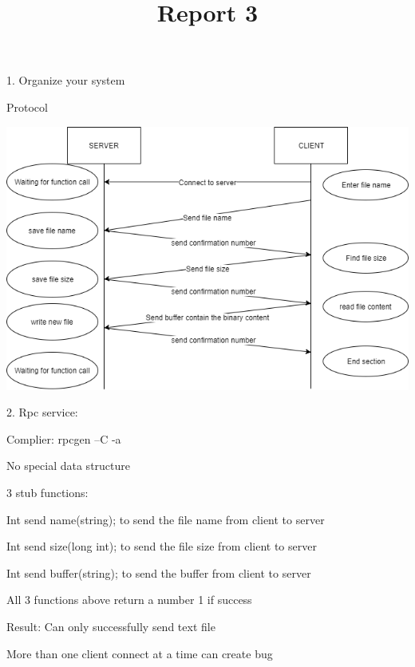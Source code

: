 \documentclass[12pt,a4paper]{article}
\title{Report 3}
\begin{document}
1. Organize your system

Protocol

\includegraphics[scale=0.7]{02.rpc_flowchart.png}

2. Rpc service:

Complier: rpcgen –C -a

No special data structure

3 stub functions:

Int send name(string); to send the file name from client to server

Int send size(long int); to send the file size from client to server

Int send buffer(string); to send the buffer from client to server

All 3 functions above return a number 1 if success

Result:
Can only successfully send text file

More than one client connect at a time can create bug
\end{document}
